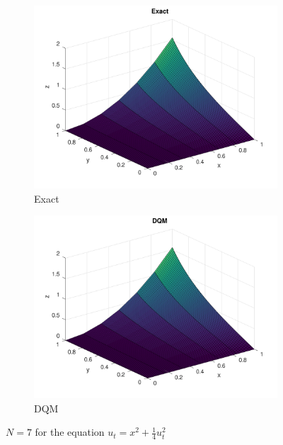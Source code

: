 \begin{solution}
\begin{english}
	\begin{figure}[ht]
		\centering
		\begin{subfigure}{0.3\textwidth}
			\includegraphics[scale=0.05]{Figures/firstExactN7}
			\caption{Exact}
		\end{subfigure}
		\qquad \begin{subfigure}{0.3\textwidth}
			\includegraphics[scale=0.05]{Figures/firstN7}
			\caption{DQM}
		\end{subfigure}
		\caption{$N=7$ for the equation $u_t = x^2 + \frac{1}{4} u_t^2$}
		\label{fig:firstexampleN7}
	\end{figure}
\end{english}
\end{solution}


